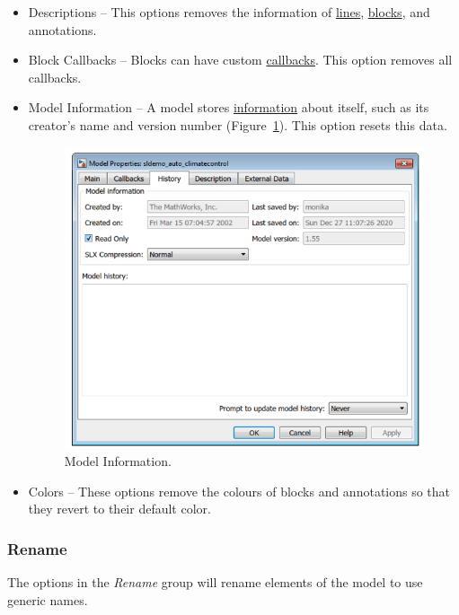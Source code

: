 \documentclass{article}
\begin{document}
\begin{itemize}
	\item Descriptions -- This options removes the  information of \href{https://www.mathworks.com/help/simulink/ug/signal-basics.html#bs9gzwp}{lines}, \href{https://www.mathworks.com/help/simulink/ug/block-properties-dialog-box.html}{blocks}, and annotations. 
	
	\item Block Callbacks -- Blocks can have custom \href{https://www.mathworks.com/help/simulink/ug/block-callbacks.html}{callbacks}. This option removes all callbacks.
	
	\item Model Information -- A \Simulink model stores \href{https://www.mathworks.com/help/simulink/ug/managing-model-versions.html}{information} about itself, such as its creator's name and version number (Figure~\ref{fig:model_history}). This option resets this data.
	
\begin{figure}[htb]
	\centering
	\includegraphics[width=.97\textwidth]{../figs/ModelHistory}
	\caption{Model Information.}
	\label{fig:model_history}
\end{figure}
	
	\item Colors -- These options remove the colours of blocks and annotations so that they revert to their default color.
\end{itemize}

\subsubsection{Rename}
\label{lbl:rename}
The options in the \emph{Rename} group will rename elements of the model to use generic names.
\end{document}

